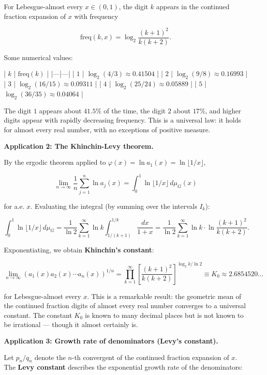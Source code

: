 \begin{theorem}\label{thm:12.17}
For Lebesgue-almost every $x \in (0, 1)$, the digit $k$ appears in the continued fraction expansion of $x$ with frequency

\[
\text{freq}(k, x) = \log_2 \frac{(k+1)^2}{k(k+2)}.
\]

Some numerical values:

| $k$ | $\text{freq}(k)$ |
|---|---|
| $1$ | $\log_2(4/3) \approx 0.41504$ |
| $2$ | $\log_2(9/8) \approx 0.16993$ |
| $3$ | $\log_2(16/15) \approx 0.09311$ |
| $4$ | $\log_2(25/24) \approx 0.05889$ |
| $5$ | $\log_2(36/35) \approx 0.04064$ |

The digit $1$ appears about $41.5\%$ of the time, the digit $2$ about $17\%$, and higher digits appear with rapidly decreasing frequency. This is a universal law: it holds for almost every real number, with no exceptions of positive measure.

\textbf{Application 2: The Khinchin-Levy theorem.}

By the ergodic theorem applied to $\varphi(x) = \ln a_1(x) = \ln \lfloor 1/x \rfloor$,

\[
\lim_{n \to \infty} \frac{1}{n} \sum_{j=1}^{n} \ln a_j(x) = \int_0^1 \ln\lfloor 1/x \rfloor \, d\mu_G(x)
\]

for a.e. $x$. Evaluating the integral (by summing over the intervals $I_k$):

\[
\int_0^1 \ln\lfloor 1/x \rfloor \, d\mu_G = \frac{1}{\ln 2} \sum_{k=1}^{\infty} \ln k \int_{1/(k+1)}^{1/k} \frac{dx}{1+x} = \frac{1}{\ln 2} \sum_{k=1}^{\infty} \ln k \cdot \ln\frac{(k+1)^2}{k(k+2)}.
\]

Exponentiating, we obtain \textbf{Khinchin's constant}:

\[
\lim_{n \to \infty} (a_1(x) a_2(x) \cdots a_n(x))^{1/n} = \prod_{k=1}^{\infty} \left[\frac{(k+1)^2}{k(k+2)}\right]^{\log_2 k / \ln 2} \equiv K_0 \approx 2.6854520\ldots
\]

for Lebesgue-almost every $x$. This is a remarkable result: the geometric mean of the continued fraction digits of almost every real number converges to a universal constant. The constant $K_0$ is known to many decimal places but is not known to be irrational --- though it almost certainly is.

\textbf{Application 3: Growth rate of denominators (Levy's constant).}

Let $p_n/q_n$ denote the $n$-th convergent of the continued fraction expansion of $x$. The \textbf{Levy constant} describes the exponential growth rate of the denominators:


\end{theorem}
